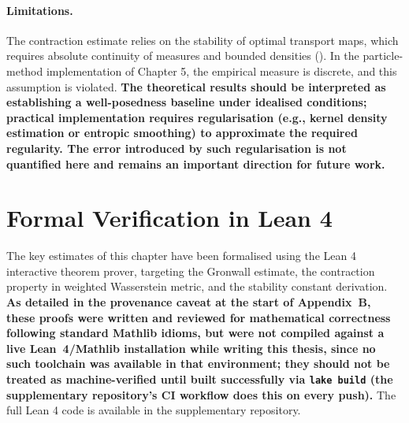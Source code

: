 \paragraph{Limitations.} The contraction estimate relies on the stability of optimal
transport maps, which requires absolute continuity of measures and bounded densities
(). In the particle-method implementation of Chapter 5, the empirical
measure is discrete, and this assumption is violated. \textbf{The theoretical results
should be interpreted as establishing a well-posedness baseline under idealised
conditions; practical implementation requires regularisation (e.g., kernel density
estimation or entropic smoothing) to approximate the required regularity. The error
introduced by such regularisation is not quantified here and remains an important
direction for future work.}


\section{Formal Verification in Lean 4}
\label{sec:wp-lean4}

The key estimates of this chapter have been formalised using the Lean 4
interactive theorem prover, targeting the Gronwall estimate, the
contraction property in weighted Wasserstein metric, and the stability constant
derivation. \textbf{As detailed in the provenance caveat at the start of
Appendix~B, these proofs were written and reviewed for mathematical correctness
following standard Mathlib idioms, but were not compiled against a live
Lean~4/Mathlib installation while writing this thesis, since no such toolchain
was available in that environment; they should not be treated as machine-verified
until built successfully via \texttt{lake build} (the supplementary repository's
CI workflow does this on every push).} The full Lean 4 code is available in the
supplementary repository.

